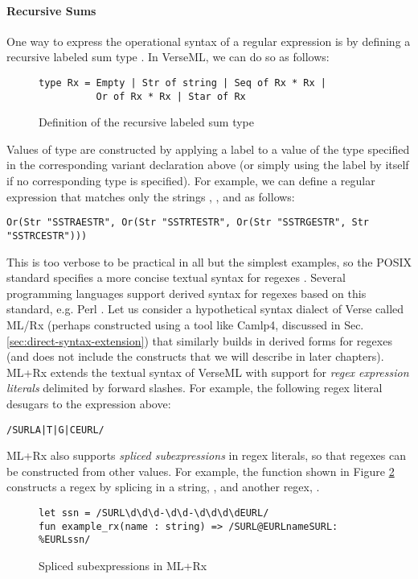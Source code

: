 \paragraph{Recursive Sums}
One way to express the operational syntax of a regular expression is by defining a recursive labeled sum type \cite{pfpl}. In VerseML, we can do so as follows:

\begin{figure}[ht]
\begin{lstlisting}[numbers=none]
type Rx = Empty | Str of string | Seq of Rx * Rx | 
          Or of Rx * Rx | Star of Rx
\end{lstlisting}
\caption{Definition of the recursive labeled sum type }
\label{fig:datatype-rx}
\end{figure}

Values of type  are constructed by applying a label to a value of the type specified in the corresponding variant declaration above (or simply using the label by itself if no corresponding type is specified). For example, we can define a regular expression that matches only the strings , ,  and  as follows:
\begin{lstlisting}[numbers=none]
Or(Str "SSTRAESTR", Or(Str "SSTRTESTR", Or(Str "SSTRGESTR", Str "SSTRCESTR")))
\end{lstlisting}

This is too verbose to be practical  in all but the simplest examples, so the POSIX standard specifies a more concise textual syntax for regexes \cite{STD95954}. Several programming languages support derived syntax for regexes based on this standard, e.g. Perl \cite{books/daglib/0028711}. Let us consider a hypothetical syntax dialect of Verse called ML/Rx (perhaps constructed using a tool like Camlp4, discussed in Sec. \ref{sec:direct-syntax-extension}) that similarly builds in derived forms for regexes (and does not include the constructs that we will describe in later chapters). ML+Rx extends the textual syntax of VerseML with support for \emph{regex expression literals} delimited by forward slashes. For example, the following regex literal desugars to the expression above:
\begin{lstlisting}[numbers=none]
/SURLA|T|G|CEURL/
\end{lstlisting}

ML+Rx also supports \emph{spliced subexpressions} in regex literals, so that regexes can be constructed from other values. For example, the function  shown in Figure \ref{fig:derived-spliced-subexpressions} constructs a regex by splicing in a string, , and another regex, . 
\begin{figure}[ht]
\begin{lstlisting}[numbers=none]
let ssn = /SURL\d\d\d-\d\d-\d\d\d\dEURL/
fun example_rx(name : string) => /SURL@EURLnameSURL: %EURLssn/
\end{lstlisting}
\caption{Spliced subexpressions in ML+Rx}
\label{fig:derived-spliced-subexpressions}
\end{figure}

